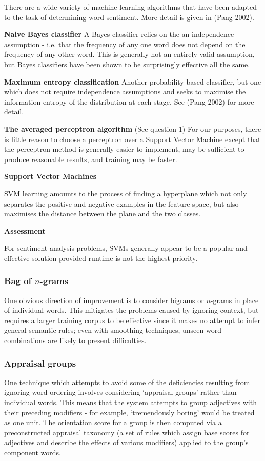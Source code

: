 \documentclass[11pt]{article}
\begin{document}
There are a wide variety of machine learning algorithms that have been adapted to the task of determining word sentiment. More detail is given in (Pang 2002)\cite{Pang2002}.

\textbf{Naive Bayes classifier}
A Bayes classifier relies on the an independence assumption - i.e. that the
frequency of any one word does not depend on the frequency of any other word.
This is generally not an entirely valid assumption, but Bayes classifiers have
been shown to be surprisingly effective all the same.

\textbf{Maximum entropy classification}
Another probability-based classifier, but one which does not require independence assumptions and seeks to maximise the information entropy of the distribution at each stage. See (Pang 2002)\cite{Pang2002} for more detail. 

\textbf{The averaged perceptron algorithm}
(See question 1)
For our purposes, there is little reason to choose a perceptron over a Support
Vector Machine except that the perceptron method is generally easier to
implement, may be sufficient to produce reasonable results, and training may
be faster.

\textbf{Support Vector Machines}

SVM learning amounts to the process of finding a hyperplane which not only
separates the positive and negative examples in the feature space, but also
maximises the distance between the plane and the two classes.

\textbf{Assessment}

For sentiment analysis problems, SVMs generally appear to be a popular and
effective solution provided runtime is not the highest priority.

\subsubsection*{Bag of $n$-grams}
One obvious direction of improvement is to consider bigrams or $n$-grams in
place of individual words. This mitigates the problems caused by ignoring
context, but requires a larger training corpus to be effective since it makes
no attempt to infer general semantic rules; even with smoothing techniques,
unseen word combinations are likely to present difficulties.

\subsubsection*{Appraisal groups}
One technique which attempts to avoid some of the deficiencies resulting from
ignoring word ordering involves considering `appraisal
groups'\cite{Whitelaw2005} rather than individual words. This means that the
system attempts to group adjectives with their preceding modifiers - for
example, `tremendously boring' would be treated as one unit. The orientation
score for a group is then computed via a preconstructed appraisal taxonomy (a
set of rules which assign base scores for adjectives and describe the effects
of various modifiers) applied to the group's component words.
\end{document}
